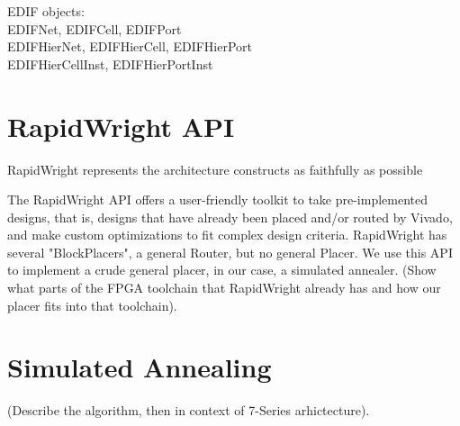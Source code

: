 \documentclass{article}
\begin{document}
\begin{multicols}{2}
    EDIF objects: \\
        EDIFNet, EDIFCell, EDIFPort \\
        EDIFHierNet, EDIFHierCell, EDIFHierPort \\
        EDIFHierCellInst, EDIFHierPortInst \\


\section{RapidWright API}
    RapidWright represents the architecture constructs as faithfully as possible

    The RapidWright API offers a user-friendly toolkit to take pre-implemented designs, that is, designs that have already been placed and/or routed by Vivado, and make custom optimizations to fit complex design criteria. 
    RapidWright has several "BlockPlacers", a general Router, but no general Placer. 
    We use this API to implement a crude general placer, in our case, a simulated annealer. 
    (Show what parts of the FPGA toolchain that RapidWright already has and how our placer fits into that toolchain). 


\section{Simulated Annealing}
    (Describe the algorithm, then in context of 7-Series arhictecture). \\


\end{multicols}
\end{document}
